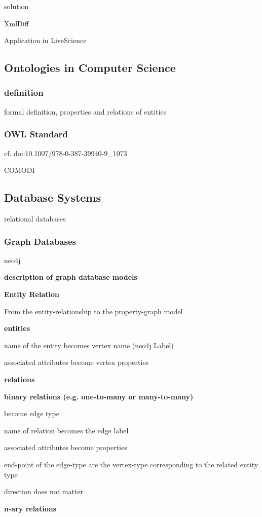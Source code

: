 \par solution
\par XmlDiff
\par Application in LiveScience\subsection{Ontologies in Computer Science}
\subsubsection{definition}

\par formal definition, properties and relations of entities\subsubsection{OWL Standard}

\par cf. doi:10.1007/978-0-387-39940-9\_1073
\par COMODI\subsection{Database Systems}

\par relational databases\subsubsection{Graph Databases}

\par neo4j\par \textbf{description of graph database models}
\par \textbf{Entity Relation}

\par From the entity-relationship to the property-graph model\par \textbf{entities}

\par name of the entity becomes vertex name (neo4j Label)
\par associated attributes become vertex properties\par \textbf{relations}
\par \textbf{binary relations
(e.g. one-to-many or many-to-many)}

\par become edge type
\par name of relation becomes the edge label
\par associated attributes become properties
\par end-point of the edge-type are the vertex-type corresponding to the related entity type
\par direction does not matter\par \textbf{n-ary relations}

